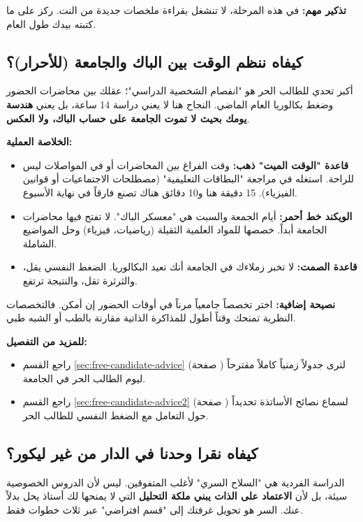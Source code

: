 \documentclass[12pt,a4paper]{book}
\begin{document}
	\textbf{تذكير مهم:} في هذه المرحلة، لا تنشغل بقراءة ملخصات جديدة من النت. ركز على ما كتبته بيدك طول العام.
	
	\subsection*{كيفاه ننظم الوقت بين الباك والجامعة (للأحرار)؟}
	
	أكبر تحدي للطالب الحر هو "انفصام الشخصية الدراسي"؛ عقلك بين محاضرات الحضور وضغط بكالوريا العام الماضي. النجاح هنا لا يعني دراسة 14 ساعة، بل يعني \textbf{هندسة يومك بحيث لا تموت الجامعة على حساب الباك، ولا العكس}.
	
	\textbf{الخلاصة العملية:}
	\begin{itemize}
		\item \textbf{قاعدة "الوقت الميت" ذهب:} وقت الفراغ بين المحاضرات أو في المواصلات ليس للراحة. استغله في مراجعة "البطاقات التعليمية" (مصطلحات الاجتماعيات أو قوانين الفيزياء). 15 دقيقة هنا و10 دقائق هناك تصنع فارقاً في نهاية الأسبوع.
		\item \textbf{الويكند خط أحمر:} أيام الجمعة والسبت هي "معسكر الباك". لا تفتح فيها محاضرات الجامعة أبداً. خصصها للمواد العلمية الثقيلة (رياضيات، فيزياء) وحل المواضيع الشاملة.
		\item \textbf{قاعدة الصمت:} لا تخبر زملاءك في الجامعة أنك تعيد البكالوريا. الضغط النفسي يقل، والثرثرة تقل، والنتيجة ترتفع.
	\end{itemize}
	
	\textbf{نصيحة إضافية:} اختر تخصصاً جامعياً مرناً في أوقات الحضور إن أمكن. فالتخصصات النظرية تمنحك وقتاً أطول للمذاكرة الذاتية مقارنة بالطب أو الشبه طبي.
	
	\textbf{للمزيد من التفصيل:}
	\begin{itemize}
		\item راجع القسم \ref{sec:free-candidate-advice} (صفحة \pageref{sec:free-candidate-advice}) لترى جدولاً زمنياً كاملاً مقترحاً ليوم الطالب الحر في الجامعة.
		\item راجع القسم \ref{sec:free-candidate-advice2} (صفحة \pageref{sec:free-candidate-advice2}) لسماع نصائح الأساتذة تحديداً حول التعامل مع الضغط النفسي للطالب الحر.
	\end{itemize}
	
	\subsection*{كيفاه نقرا وحدنا في الدار من غير ليكور؟}
	
	الدراسة الفردية هي "السلاح السري" لأغلب المتفوقين. ليس لأن الدروس الخصوصية سيئة، بل لأن \textbf{الاعتماد على الذات يبني ملكة التحليل} التي لا يمنحها لك أستاذ يحل بدلاً عنك. السر هو تحويل غرفتك إلى "قسم افتراضي" عبر ثلاث خطوات فقط.
	
\end{document}
